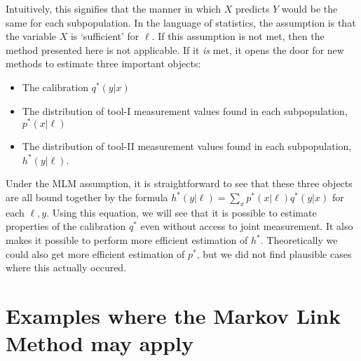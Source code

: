 Intuitively, this signifies that the manner in which $X$ predicts $Y$ would be the same for each subpopulation.  In the language of statistics, the assumption is that the variable $X$ is `sufficient' for $\ell$.  If this assumption is not met, then the method presented here is not applicable.  If it \emph{is} met, it opens the door for new methods to estimate three important objects:

\begin{itemize} 
    \item The calibration $q^*(y|x)$ 
    \item The distribution of tool-I measurement values found in each subpopulation, $p^*(x|\ell)$ 
    \item The distribution of tool-II measurement values found in each subpopulation,  $h^*(y|\ell)$.  
\end{itemize}

Under the MLM assumption, it is straightforward to see that these three objects are all bound together by the formula $h^*(y|\ell) = \sum_x p^*(x|\ell)q^*(y|x)$ for each $\ell,y$.  Using this equation, we will see that it is possible to estimate properties of the calibration $q^*$ even without access to joint measurement.  It also makes it possible to perform more efficient estimation of $h^*$.  Theoretically we could also get more efficient estimation of $p^*$, but we did not find plausible cases where this actually occured.  


\section{Examples where the Markov Link Method may apply}

